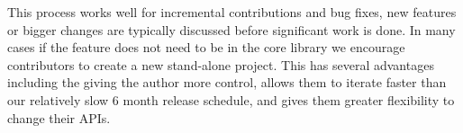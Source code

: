 \documentclass[12pt]{article}
\numberwithin{page}{section}
\begin{document}
This process works well for incremental contributions and bug fixes,
new features or bigger changes are typically discussed before
significant work is done.  In many cases if the feature does not need
to be in the core library we encourage contributors to create a new
stand-alone project.  This has several advantages including the giving
the author more control, allows them to iterate faster than our
relatively slow 6 month release schedule, and gives them greater
flexibility to change their APIs.


\newpage

\def\ref@jnl#1{{\rm#1}}

\def\aj{\ref@jnl{AJ}}                   %
\def\actaa{\ref@jnl{Acta Astron.}}      %
\def\araa{\ref@jnl{ARA\&A}}             %
\def\apj{\ref@jnl{ApJ}}                 %
\def\apjl{\ref@jnl{ApJ}}                %
\def\apjs{\ref@jnl{ApJS}}               %
\def\ao{\ref@jnl{Appl.~Opt.}}           %
\def\apss{\ref@jnl{Ap\&SS}}             %
\def\aap{\ref@jnl{A\&A}}                %
\def\aapr{\ref@jnl{A\&A~Rev.}}          %
\def\aaps{\ref@jnl{A\&AS}}              %
\def\azh{\ref@jnl{AZh}}                 %
\def\baas{\ref@jnl{BAAS}}               %
\def\bac{\ref@jnl{Bull. astr. Inst. Czechosl.}}
\def\caa{\ref@jnl{Chinese Astron. Astrophys.}}
\def\cjaa{\ref@jnl{Chinese J. Astron. Astrophys.}}
\def\icarus{\ref@jnl{Icarus}}           %
\def\jcap{\ref@jnl{J. Cosmology Astropart. Phys.}}
\def\jrasc{\ref@jnl{JRASC}}             %
\def\memras{\ref@jnl{MmRAS}}            %
\def\mnras{\ref@jnl{MNRAS}}             %
\def\na{\ref@jnl{New A}}                %
\def\nar{\ref@jnl{New A Rev.}}          %
\def\pra{\ref@jnl{Phys.~Rev.~A}}        %
\def\prb{\ref@jnl{Phys.~Rev.~B}}        %
\def\prc{\ref@jnl{Phys.~Rev.~C}}        %
\end{document}
